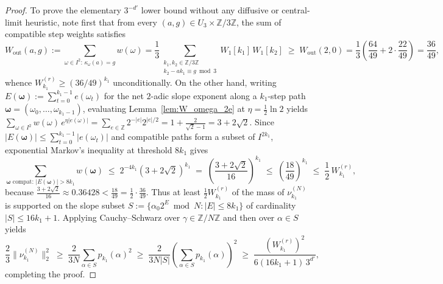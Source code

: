\documentclass[11pt,a4paper]{article}
\numberwithin{equation}{section}
\theoremstyle{definition}
\theoremstyle{remark}
\newcommand{\Z}{\mathbb{Z}}
\begin{document}
\begin{proof}
To prove the elementary $3^{-d'}$ lower bound without any diffusive or central-limit heuristic, note first that from every $(a, g) \in U_3 \times \Z/3\Z$, the sum of compatible step weights satisfies
\[
W_{\mathrm{out}}(a, g) := \sum_{\omega \in I^2:\, \kappa_\omega(a)=g} w(\omega) = \frac{1}{3}\sum_{\substack{k_1, k_2 \in \Z/3\Z \\ k_2 - a k_1 \equiv g \bmod 3}} W_1[k_1]\,W_1[k_2] \;\ge\; W_{\mathrm{out}}(2, 0) = \frac{1}{3}\left(\frac{64}{49} + 2\cdot\frac{22}{49}\right) = \frac{36}{49},
\]
whence $W_{k_1}^{(r)} \ge (36/49)^{k_1}$ unconditionally. On the other hand, writing $E(\boldsymbol{\omega}) := \sum_{t=0}^{k_1 - 1} e(\omega_t)$ for the net $2$-adic slope exponent along a $k_1$-step path $\boldsymbol{\omega} = (\omega_0, \dots, \omega_{k_1-1})$, evaluating Lemma~\ref{lem:W_omega_2e} at $\eta = \frac{1}{2}\ln 2$ yields $\sum_{\omega \in I^2} w(\omega)\, e^{\eta |e(\omega)|} = \sum_{e \in \Z} 2^{-|e|} 2^{|e|/2} = 1 + \frac{2}{\sqrt{2}-1} = 3 + 2\sqrt{2}$. Since $|E(\boldsymbol{\omega})| \le \sum_{t=0}^{k_1-1} |e(\omega_t)|$ and compatible paths form a subset of $I^{2k_1}$, exponential Markov's inequality at threshold $8 k_1$ gives
\[
\sum_{\boldsymbol{\omega}\text{ compat}:\, |E(\boldsymbol{\omega})| > 8 k_1} w(\boldsymbol{\omega}) \;\le\; 2^{-4 k_1}(3 + 2\sqrt{2})^{k_1} \;=\; \left(\frac{3 + 2\sqrt{2}}{16}\right)^{k_1} \;\le\; \left(\frac{18}{49}\right)^{k_1} \;\le\; \frac{1}{2}\, W_{k_1}^{(r)},
\]
because $\frac{3 + 2\sqrt{2}}{16} \approx 0.36428 < \frac{18}{49} = \frac{1}{2}\cdot\frac{36}{49}$. Thus at least $\frac{1}{2}W_{k_1}^{(r)}$ of the mass of $\nu_{k_1}^{(N)}$ is supported on the slope subset $S := \{\alpha_0 2^E \bmod N : |E| \le 8 k_1\}$ of cardinality $|S| \le 16 k_1 + 1$. Applying Cauchy--Schwarz over $\gamma \in \Z/N\Z$ and then over $\alpha \in S$ yields
\[
\frac{2}{3}\bigl\|\nu_{k_1}^{(N)}\bigr\|_2^2 \;\ge\; \frac{2}{3 N}\sum_{\alpha \in S} p_{k_1}(\alpha)^2 \;\ge\; \frac{2}{3 N |S|}\left(\sum_{\alpha \in S} p_{k_1}(\alpha)\right)^2 \;\ge\; \frac{(W_{k_1}^{(r)})^2}{6(16 k_1 + 1)\,3^{d'}},
\]
completing the proof.
\end{proof}
\end{document}
